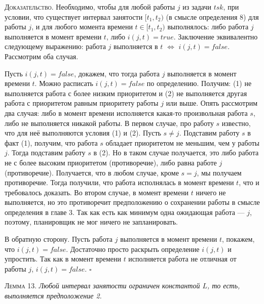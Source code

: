 \documentclass[14pt]{matmex-diploma-custom}
\begin{document}
\textsc{Доказательство.} Необходимо, чтобы для любой работы $j$ из задачи $tsk$, 
  при условии, что существует интервал занятости $[t_1, t_2)$ (в смысле определения 8) 
  для работы $j$, и для любого момента времени $t \in [t_1, t_2)$ выполнялось: 
   либо работа $j$ выполняется в момент времени $t$, либо $i(j,t) = true$. 
  Заключение эквивалентно следующему выражению: работа $j$ выполняется в $t$ 
    $\Leftrightarrow$ $i(j,t) = false$. Рассмотрим оба случая.

  Пусть $i(j,t) = false$, докажем, что тогда работа $j$ выполняется в момент 
    времени $t$. Можно расписать $i(j,t) = false$ по определению. 
    Получим: (1) не выполняется работа с более низким приоритетом и (2) не выполняется 
    другая работа с приоритетом равным приоритету работы $j$ или выше. Опять рассмотрим 
    два случая: либо в момент времени исполняется какая-то произвольная работа $s$, либо не выполняется никакой работы. 
  В первом случае, про работу $s$ известно, что для неё выполняются условия (1) и (2). 
    Пусть $s \neq j$. Подставим работу $s$ в факт (1), получим, что работа $s$ обладает
    приоритетом не меньшим, чем у работы $j$. Тогда подставим работу $s$ в (2). Но в таком случае получается, это либо работа не с более высоким приоритетом (противоречие), либо равна работе $j$ (противоречие). Получается, что в любом случае, кроме $s = j$, мы получаем противоречие. Тогда получили, что работа 
    исполнялась в момент времени $t$, что и требовалось доказать. 
  Во втором случае, в момент времени $t$ ничего не выполняется, но это противоречит 
    предположению о сохранении работы в смысле определения в главе 3. 
  Так как есть как минимум одна ожидающая работа --- $j$, поэтому, планировщик не мог ничего не запланировать. 
  
  В обратную сторону. Пусть работа $j$ выполняется в момент времени $t$, покажем, что $i(j,t) = false$. 
    Достаточно просто раскрыть определение $i(j,t)$ и упростить. Так как в момент времени $t$
    исполняется работа не отличная от работы $j$, $i(j,t) = false$.
$\square$


\textsc{Лемма 13.}
\textit{Любой интервал занятости ограничен константой $L$, то есть, выполняется предположение 2. }
\end{document}
